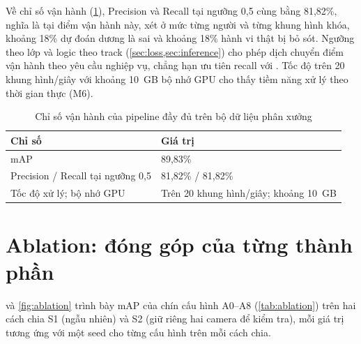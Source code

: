 Về chỉ số vận hành (\cref{tab:operating}), Precision và Recall tại ngưỡng 0,5 cùng bằng 81,82\%, nghĩa là tại điểm vận hành này, xét ở mức từng người và từng khung hình khóa, khoảng 18\% dự đoán dương là sai và khoảng 18\% hành vi thật bị bỏ sót. Ngưỡng theo lớp và logic theo track (\cref{sec:loss,sec:inference}) cho phép dịch chuyển điểm vận hành theo yêu cầu nghiệp vụ, chẳng hạn ưu tiên recall với . Tốc độ trên 20 khung hình/giây với khoảng 10~GB bộ nhớ GPU cho thấy tiềm năng xử lý theo thời gian thực (M6).

\begin{table}[htbp]
\centering
\caption[Chỉ số vận hành của pipeline đầy đủ]{Chỉ số vận hành của pipeline đầy đủ trên bộ dữ liệu phân xưởng}
\label{tab:operating}
\begin{tabularx}{\textwidth}{lX}
\toprule
\textbf{Chỉ số} & \textbf{Giá trị}\\
\midrule
mAP & 89,83\%\\
Precision / Recall tại ngưỡng 0,5 & 81,82\% / 81,82\%\\
Tốc độ xử lý; bộ nhớ GPU & Trên 20 khung hình/giây; khoảng 10~GB\\
\bottomrule
\end{tabularx}
\end{table}

\section{Ablation: đóng góp của từng thành phần}
\label{sec:ablation-results}

 và \cref{fig:ablation} trình bày mAP của chín cấu hình A0--A8 (\cref{tab:ablation}) trên hai cách chia S1 (ngẫu nhiên) và S2 (giữ riêng hai camera để kiểm tra), mỗi giá trị tương ứng với một seed cho từng cấu hình trên mỗi cách chia.

